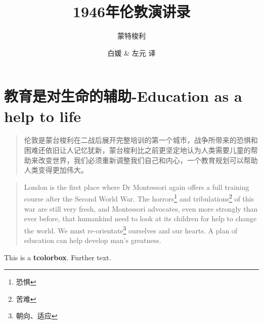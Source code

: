\documentclass[lang=cn,10pt]{elegantbook}
\title{1946年伦敦演讲录}
\subtitle{蒙特梭利}
\author{白媛 \& 左元 译}
\begin{document}
\maketitle
\frontmatter

\tableofcontents

\mainmatter

\chapter{教育是对生命的辅助-Education as a help to life}

\begin{quote}
{\small 伦敦是蒙台梭利在二战后展开完整培训的第一个城市，战争所带来的恐惧和困难还依旧让人记忆犹新，蒙台梭利比之前更坚定地认为人类需要儿童的帮助来改变世界，我们必须重新调整我们自己和内心，一个教育规划可以帮助人类变得更加伟大。}
\end{quote}

\begin{tcolorbox}
\begin{quote}
{\small London is the first place where Dr Montessori again offers a full training course after the Second World War. The horrors\footnote{恐惧} and tribulations\footnote{苦难} of this war are still very fresh, and Montessori advocates, even more strongly than ever before, that humankind need to look at its children for help to change the world. We must re-orientate\footnote{朝向、适应} ourselves and our hearts. A plan of education can help develop man's greatness.}
\end{quote}
\end{tcolorbox}

\begin{tcolorbox}[title=My title,
colback=red!5!white,
colframe=red!75!black,
fonttitle=\bfseries]
This is a \textbf{tcolorbox}.
Further text.
\end{tcolorbox}
\end{document}
